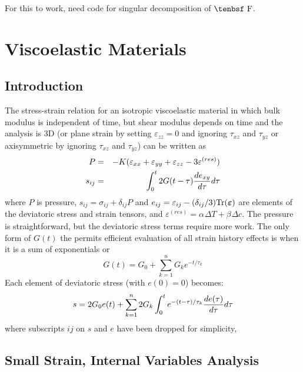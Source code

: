 \documentclass[11pt]{book}
\newcommand{\tens}[1]{\boldsymbol{\mathsf{#1}}}
\def\a#1{\alpha_{#1}}
\def\b#1{\beta_{#1}}
\def\DT{\Delta T}
\def\e#1{\varepsilon_{#1}}
\def\er#1{\varepsilon_{#1}^{(res)}}
\def\F{\hbox{\tenbsf F}}
\def\t#1{\tau_{#1}}
\begin{document}
For this to work, need code for singular decomposition of $\F$.

\chapter{Viscoelastic Materials}

\section{Introduction}

The stress-strain relation for an isotropic viscoelastic material in which bulk modulus is independent of time, but shear modulus depends on time and the analysis is 3D (or plane strain by setting $\e{zz}=0$ and ignoring $\t{xz}$ and $\t{yz}$ or axisymmetric by ignoring $\t{xz}$ and $\t{yz}$) can be written as
\begin{eqnarray}
      P & = & -K(\e{xx} + \e{yy} + \e{zz} - 3\er{})  \\
      s_{ij} & = & \int_0^t 2G(t-\tau) {de_{xy}\over d\tau} d\tau
\end{eqnarray}
where $P$ is pressure, $s_{ij} = \sigma_{ij}+\delta_{ij}P$ and $e_{ij} = \varepsilon_{ij} - (\delta_{ij}/3){\rm Tr}( \tens\varepsilon)$ are elements of the deviatoric stress and strain tensors, and $\er{} = \a{}\DT + \b{}\Delta c$.
The pressure is straightforward, but the deviatoric stress terms require more work. The only form of $G(t)$ the permits efficient evaluation of all strain history effects is when it is a sum of exponentials or
\begin{equation}
        G(t) = G_0 + \sum_{k=1}^n G_k e^{-t/\tau_k}
\end{equation}
Each element of deviatoric stress (with $e(0)=0$) becomes:
\begin{equation}
     s = 2G_0 e(t) + \sum_{k=1}^n 2 G_k \int_0^t e^{-(t-\tau)/\tau_k} {de(\tau)\over d\tau} d\tau
\end{equation}
where subscripts $ij$ on $s$ and $e$ have been dropped for simplicity,

\section{Small Strain, Internal Variables Analysis}
\end{document}
